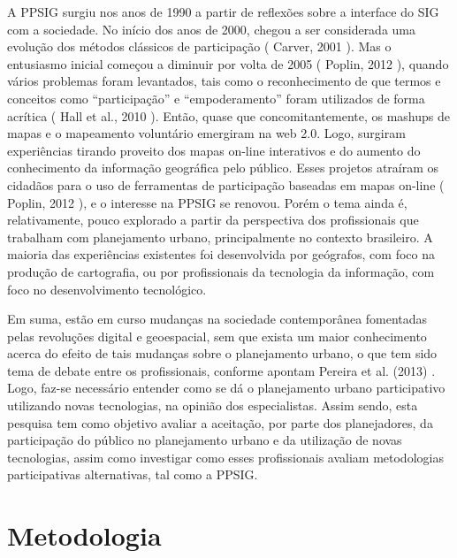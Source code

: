 \documentclass{article}
\begin{document}
A PPSIG surgiu nos anos de 1990 a partir de reflexões sobre a interface do SIG com a
				sociedade. No início dos anos de 2000, chegou a ser considerada uma evolução dos
				métodos clássicos de participação (%
Carver,
					2001%
). Mas o entusiasmo inicial começou a diminuir por volta de 2005
					(%
Poplin, 2012%
), quando vários problemas
				foram levantados, tais como o reconhecimento de que termos e conceitos como
				“participação” e “empoderamento” foram utilizados de forma acrítica (%
Hall et al., 2010%
). Então, quase que
				concomitantemente, os %
mashups%
 de mapas e o mapeamento voluntário
				emergiram na web 2.0. Logo, surgiram experiências tirando proveito dos mapas on-line
				interativos e do aumento do conhecimento da informação geográfica pelo público.
				Esses projetos atraíram os cidadãos para o uso de ferramentas de participação
				baseadas em mapas on-line (%
Poplin, 2012%
), e
				o interesse na PPSIG se renovou. Porém o tema ainda é, relativamente, pouco
				explorado a partir da perspectiva dos profissionais que trabalham com planejamento
				urbano, principalmente no contexto brasileiro. A maioria das experiências existentes
				foi desenvolvida por geógrafos, com foco na produção de cartografia, ou por
				profissionais da tecnologia da informação, com foco no desenvolvimento
				tecnológico.

Em suma, estão em curso mudanças na sociedade contemporânea fomentadas pelas
				revoluções digital e geoespacial, sem que exista um maior conhecimento acerca do
				efeito de tais mudanças sobre o planejamento urbano, o que tem sido tema de debate
				entre os profissionais, conforme apontam %
Pereira et
					al. (2013)%
. Logo, faz-se necessário entender como se dá o planejamento
				urbano participativo utilizando novas tecnologias, na opinião dos especialistas.
				Assim sendo, esta pesquisa tem como objetivo avaliar a aceitação, por parte dos
				planejadores, da participação do público no planejamento urbano e da utilização de
				novas tecnologias, assim como investigar como esses profissionais avaliam
				metodologias participativas alternativas, tal como a PPSIG.

\section{%
Metodologia}
\end{document}
